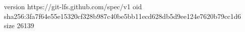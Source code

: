 version https://git-lfs.github.com/spec/v1
oid sha256:3fa7f64e55e15320cf328b987c40be5bb11ecd628db5d9ee124e7620b79cc1d6
size 26139
